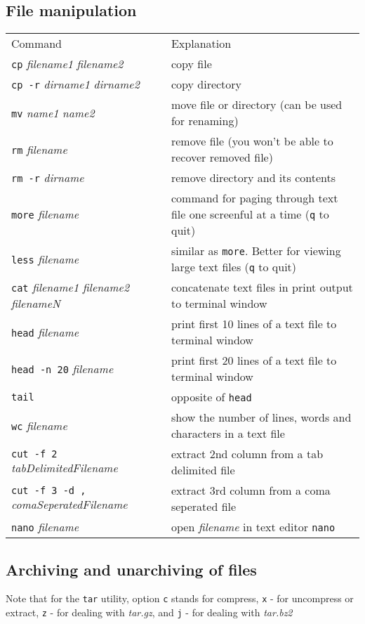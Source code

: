 \subsection{File manipulation}
\begin{tabular}{ll}
  Command & Explanation \\
  \hhline{==}
  \texttt{cp} \textit{filename1} \textit{filename2} & copy file \\
  \texttt{cp -r} \textit{dirname1} \textit{dirname2} & copy directory \\
  \texttt{mv} \textit{name1} \textit{name2} & move file or directory (can be used for renaming) \\
  \texttt{rm} \textit{filename} & remove file (you won't be able to recover removed file) \\
  \texttt{rm -r} \textit{dirname} & remove directory and its contents \\
  \texttt{more} \textit{filename} & command for paging through text file one screenful at a time (\texttt{q} to quit)\\
  \texttt{less} \textit{filename} & similar as \texttt{more}. Better for viewing large text files (\texttt{q} to quit) \\
  \texttt{cat} \textit{filename1 filename2 filenameN} & concatenate text files in print output to terminal window \\
  \texttt{head} \textit{filename} & print first 10 lines of a text file to terminal window \\
  \texttt{head -n 20} \textit{filename} &  print first 20 lines of a text file to terminal window \\
  \texttt{tail} & opposite of \texttt{head} \\
  \texttt{wc} \textit{filename} & show the number of lines, words and characters in a text file \\
  \texttt{cut -f 2} \textit{tabDelimitedFilename} & extract 2nd column from a tab delimited file \\
  \texttt{cut -f 3 -d ,} \textit{comaSeperatedFilename} & extract 3rd column from a coma seperated file \\
  \texttt{nano} \textit{filename} & open \textit{filename} in text editor \texttt{nano} \\
\end{tabular}

\subsection{Archiving and unarchiving of files}
Note that for the \texttt{tar} utility, option \texttt{c} stands for compress, 
\texttt{x} - for uncompress or extract, \texttt{z} - for dealing with \textit{tar.gz},
and \texttt{j} - for dealing with \textit{tar.bz2}\\~\\
